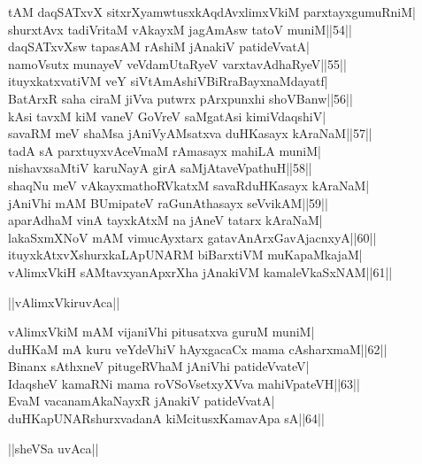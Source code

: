 \documentclass{article}
\begin{document}
tAM daqSATxvX sitxrXyamwtusxkAqdAvxlimxVkiM parxtayxgumuRniM|\\
shurxtAvx tadiVritaM vAkayxM jagAmAsw tatoV muniM||54||\\
daqSATxvXsw tapasAM rAshiM jAnakiV patideVvatA|\\
namoVsutx munayeV veVdamUtaRyeV varxtavAdhaRyeV||55||\\
ituyxkatxvatiVM veY siVtAmAshiVBiRraBayxnaMdayatf|\\
BatArxR saha ciraM jiVva putwrx pArxpunxhi shoVBanw||56||\\
kAsi tavxM kiM vaneV GoVreV saMgatAsi kimiVdaqshiV|\\
savaRM meV shaMsa jAniVyAMsatxva duHKasayx kAraNaM||57||\\
tadA sA parxtuyxvAceVmaM rAmasayx mahiLA muniM|\\
nishavxsaMtiV karuNayA girA saMjAtaveVpathuH||58||\\
shaqNu meV vAkayxmathoRVkatxM savaRduHKasayx kAraNaM|\\
jAniVhi mAM BUmipateV raGunAthasayx seVvikAM||59||\\
aparAdhaM vinA tayxkAtxM na jAneV tatarx kAraNaM|\\
lakaSxmXNoV mAM vimucAyxtarx gatavAnArxGavAjacnxyA||60||\\
ituyxkAtxvXshurxkaLApUNARM biBarxtiVM muKapaMkajaM|\\
vAlimxVkiH sAMtavxyanApxrXha jAnakiVM kamaleVkaSxNAM||61||\\

\begin{center}
||vAlimxVkiruvAca||
\end{center}

vAlimxVkiM mAM vijaniVhi pitusatxva guruM muniM|\\
duHKaM mA kuru veYdeVhiV hAyxgacaCx mama cAsharxmaM||62||\\
Binanx sAthxneV pitugeRVhaM jAniVhi patideVvateV|\\
IdaqsheV kamaRNi mama roVSoVsetxyXVva mahiVpateVH||63||\\
EvaM vacanamAkaNayxR jAnakiV patideVvatA|\\
duHKapUNARshurxvadanA kiMcitusxKamavApa sA||64||\\

\begin{center}
||sheVSa uvAca||
\end{center}
\end{document}
